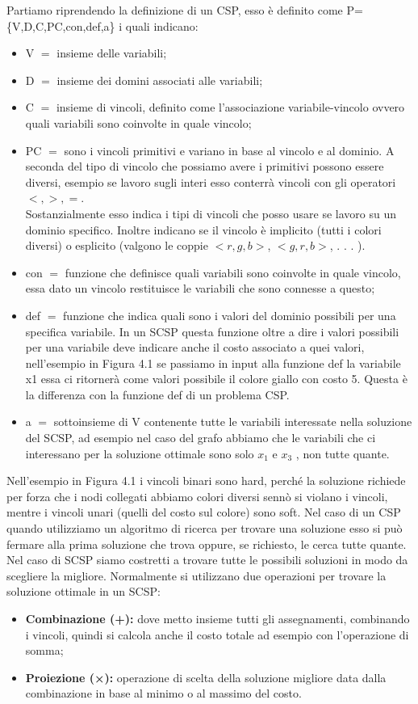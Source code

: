 Partiamo riprendendo la definizione di un CSP, esso è definito come P=\{V,D,C,PC,con,def,a\} i quali indicano:
\begin{itemize}
    \item V $=$ insieme delle variabili;
    \item D $=$ insieme dei domini associati alle variabili;
    \item C $=$ insieme di vincoli, definito come l'associazione variabile-vincolo ovvero quali variabili sono coinvolte in quale vincolo;
    \item PC $=$ sono i vincoli primitivi e variano in base al vincolo e al dominio. A seconda del tipo di vincolo che possiamo avere i primitivi possono essere diversi, esempio se lavoro sugli interi esso conterrà vincoli con gli operatori $<,>,=$.
          \\Sostanzialmente esso indica i tipi di vincoli che posso usare se lavoro su un dominio specifico. Inoltre indicano se il vincolo è implicito (tutti i colori diversi) o esplicito (valgono le coppie $<r,g,b>$, $<g,r,b>$, . . . ).
    \item con $=$ funzione che definisce quali variabili sono coinvolte in quale vincolo, essa dato un vincolo restituisce le variabili che sono connesse a questo;
    \item def $=$ funzione che indica quali sono i valori del dominio possibili per una specifica variabile. In un SCSP questa funzione oltre a dire i valori possibili per una variabile deve indicare anche il costo associato a quei valori, nell'esempio in Figura 4.1 se passiamo in input alla funzione def la variabile x1 essa ci ritornerà come valori possibile il colore giallo con costo 5. Questa è la differenza con la funzione def di un problema CSP.
    \item a $=$ sottoinsieme di V contenente tutte le variabili interessate nella soluzione del SCSP, ad esempio nel caso del grafo abbiamo che le variabili che ci interessano per la soluzione ottimale sono solo $x_1$ e $x_3$ , non tutte quante.
\end{itemize}
Nell'esempio in Figura 4.1 i vincoli binari sono hard, perché la soluzione richiede per forza che i nodi collegati abbiamo colori diversi sennò si violano i vincoli, mentre i vincoli unari (quelli del costo sul colore) sono soft. Nel caso di un CSP quando utilizziamo un algoritmo di ricerca per trovare una soluzione esso si può fermare alla prima soluzione che trova oppure, se richiesto, le cerca tutte quante. Nel caso di SCSP siamo costretti a trovare tutte le possibili soluzioni in modo da scegliere la
migliore. Normalmente si utilizzano due operazioni per trovare la soluzione ottimale in un SCSP:
\begin{itemize}
    \item \textbf{Combinazione (+):} dove metto insieme tutti gli assegnamenti, combinando i vincoli, quindi si calcola anche il costo totale ad esempio con l'operazione di somma;
    \item \textbf{Proiezione (×):} operazione di scelta della soluzione migliore data dalla combinazione in base al minimo o al massimo del costo.
\end{itemize}

